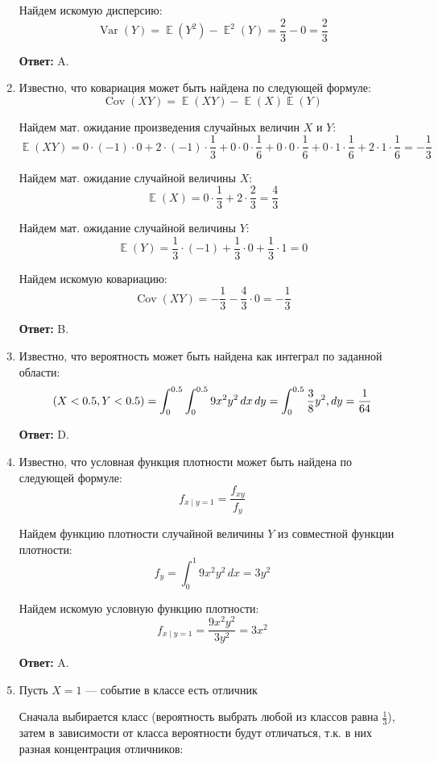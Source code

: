 \documentclass[a4paper]{article} %
\DeclareMathOperator{\Var}{Var}
\DeclareMathOperator{\Cov}{Cov}
\DeclareMathOperator{\E}{\mathbb{E}}
\let\P\relax
\DeclareMathOperator{\P}{\mathbb{P}}
\begin{document}
\begin{enumerate}
    Найдем искомую дисперсию:
    \[
    \Var(Y) = \E(Y^2) - \E^2(Y) = \frac{2}{3} - 0 = \frac{2}{3}
    \]
    
    \textbf{Ответ:} A.
    
    
    \item
    Известно, что ковариация может быть найдена по следующей формуле:
    \[
    \Cov(XY) = \E(XY) - \E(X)\E(Y)
    \]
    
    Найдем мат. ожидание произведения случайных величин $X$ и $Y$:
    \[
    \E(XY) = 0\cdot(-1)\cdot0 + 2\cdot(-1)\cdot\frac{1}{3} + 0\cdot0\cdot\frac{1}{6} + 0\cdot0\cdot\frac{1}{6} + 0\cdot1\cdot\frac{1}{6} + 2\cdot1\cdot\frac{1}{6} = -\frac{1}{3}
    \]
    
    Найдем мат. ожидание случайной величины $X$:
    \[
    \E(X) = 0\cdot\frac{1}{3} + 2\cdot\frac{2}{3} = \frac{4}{3}
    \]
    
    Найдем мат. ожидание случайной величины $Y$:
    \[
    \E(Y) = \frac{1}{3} \cdot (-1) + \frac{1}{3} \cdot 0 + \frac{1}{3} \cdot 1 = 0
    \]
    
    Найдем искомую ковариацию:
    \[
    \Cov(XY) = -\frac{1}{3} - \frac{4}{3}\cdot0 = -\frac{1}{3}
    \]
    
    \textbf{Ответ:} B.
    
    
    \item
    Известно, что вероятность может быть найдена как интеграл по заданной области:
    \[
    \P(X<0.5, Y<0.5) = \int_{0}^{0.5}\int_{0}^{0.5} 9x^2y^2 \,dx\,dy = \int_{0}^{0.5} \frac{3}{8}y^2 ,dy = \frac{1}{64}
    \]
    
    \textbf{Ответ:} D.
    
    
    \item
    Известно, что условная функция плотности может быть найдена по следующей формуле:
    \[
    f_{x\mid y=1} = \frac{f_{xy}}{f_{y}}
    \]
    
    Найдем функцию плотности случайной величины $Y$ из совместной функции плотности:
    \[
    f_{y} = \int_{0}^{1} 9x^2y^2 \,dx = 3y^2
    \]
    
    Найдем искомую условную функцию плотности:
    \[
    f_{x\mid y=1} = \frac{9x^2y^2}{3y^2} = 3x^2
    \]
    
    \textbf{Ответ:} A.
    
    
    \item
    Пусть $X=1$ — событие в классе есть отличник
    
    Сначала выбирается класс (вероятность выбрать любой из классов равна $\frac{1}{3}$), затем в зависимости от класса вероятности будут отличаться, т.к. в них разная концентрация отличников:
    

\end{enumerate}
\end{document}
